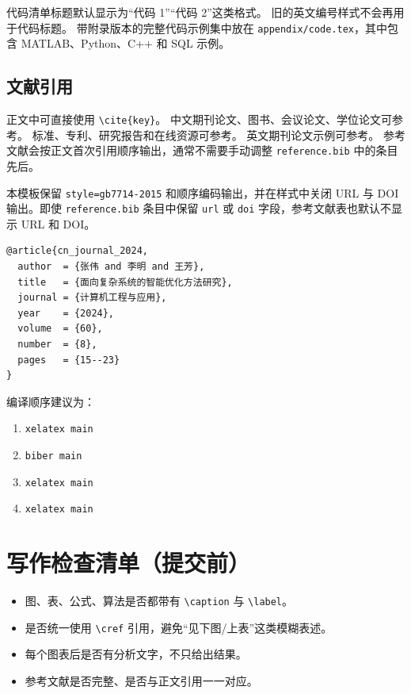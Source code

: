 代码清单标题默认显示为“代码 1”“代码 2”这类格式。
旧的英文编号样式不会再用于代码标题。
带附录版本的完整代码示例集中放在 \verb|appendix/code.tex|，其中包含 MATLAB、Python、C++ 和 SQL 示例。

\subsection{文献引用}
正文中可直接使用 \verb|\cite{key}|。
中文期刊论文、图书、会议论文、学位论文可参考\cite{cn_journal_2024,cn_book_2021,cn_conference_2023,cn_thesis_2022}。
标准、专利、研究报告和在线资源可参考\cite{cn_standard_2020,cn_patent_2021,cn_report_2022,cn_online_2024}。
英文期刊论文示例可参考\cite{alorf_survey_2023}。
参考文献会按正文首次引用顺序输出，通常不需要手动调整 \verb|reference.bib| 中的条目先后。

本模板保留 \verb|style=gb7714-2015| 和顺序编码输出，并在样式中关闭 URL 与 DOI 输出。即使 \verb|reference.bib| 条目中保留 \verb|url| 或 \verb|doi| 字段，参考文献表也默认不显示 URL 和 DOI。

\begin{verbatim}
@article{cn_journal_2024,
  author  = {张伟 and 李明 and 王芳},
  title   = {面向复杂系统的智能优化方法研究},
  journal = {计算机工程与应用},
  year    = {2024},
  volume  = {60},
  number  = {8},
  pages   = {15--23}
}
\end{verbatim}

编译顺序建议为：
\begin{enumerate}
  \item \verb|xelatex main|
  \item \verb|biber main|
  \item \verb|xelatex main|
  \item \verb|xelatex main|
\end{enumerate}

\section{写作检查清单（提交前）}

\begin{itemize}
  \item 图、表、公式、算法是否都带有 \verb|\caption| 与 \verb|\label|。
  \item 是否统一使用 \verb|\cref| 引用，避免“见下图/上表”这类模糊表述。
  \item 每个图表后是否有分析文字，不只给出结果。
  \item 参考文献是否完整、是否与正文引用一一对应。
\end{itemize}
